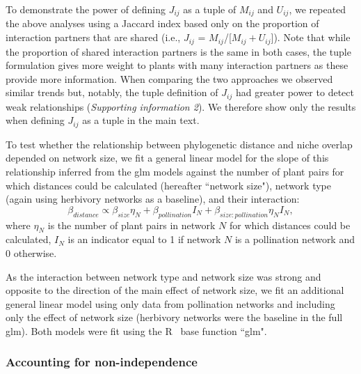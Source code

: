 \documentclass[12pt]{article}
\begin{document}
\begin{spacing}{1.5}
    To demonstrate the power of defining $J_{ij}$ as a tuple of $M_{ij}$ and $U_{ij}$, we repeated the above analyses using a Jaccard index based only on the proportion of interaction partners that are shared (i.e., $J_{ij}$ = $M_{ij}$/[$M_{ij}+U_{ij}$]). Note that while the proportion of shared interaction partners is the same in both cases, the tuple formulation gives more weight to plants with many interaction partners as these provide more information. When comparing the two approaches 
    we observed similar trends but, notably, the tuple definition of $J_{ij}$ had greater power to detect weak relationships (\emph{Supporting information 2}). We therefore show only the results when defining $J_{ij}$ as a tuple in the main text.


    To test whether the relationship between phylogenetic distance and niche overlap depended on network size, we fit a general linear model for the slope of this relationship inferred from the glm models against the number of plant pairs for which distances could be calculated (hereafter ``network size"), network type (again using herbivory networks as a baseline), and their interaction:
      \begin{equation}
        \beta_{distance} \propto \beta_{size} \eta_{N} + \beta_{pollination} I_N + \beta_{size:pollination} \eta_{N} I_N ,
      \end{equation}
    where $\eta_{N}$ is the number of plant pairs in network $N$ for which distances could be calculated, $I_N$ is an indicator equal to 1 if network $N$ is a pollination network and 0 otherwise. 


    As the interaction between network type and network size was strong and opposite to the direction of the main effect of network size, we fit an additional general linear model using only data from pollination networks and including only the effect of network size (herbivory networks were the baseline in the full glm). Both models were fit using the R~\citep{R} base function ``glm".


    \subsubsection*{Accounting for non-independence}


\end{spacing}
\end{document}
